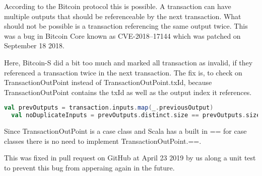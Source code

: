 According to the Bitcoin protocol this is possible.
A transaction can have multiple outputs that should be referenceable by the next transaction.
What should not be possible is a transaction referencing the same output twice.
This was a bug in Bitcoin Core known as CVE-2018–17144 which was patched on September 18 2018.

Here, Bitcoin-S did a bit too much and marked all transaction as invalid, if they referenced a transaction twice in the next transaction.
The fix is, to check on TransactionOutPoint instead of TransactionOutPoint.txId, because TransactionOutPoint contains the txId as well as the output index it references.
\begin{lstlisting}[language=scala]
  val prevOutputs = transaction.inputs.map(_.previousOutput)
  val noDuplicateInputs = prevOutputs.distinct.size == prevOutputs.size
\end{lstlisting}
Since TransactionOutPoint is a case class and Scala has a built in == for case classes there is no need to implement TransactionOutPoint.==.

This was fixed in pull request  on GitHub at April 23 2019 by us along a unit test to prevent this bug from apperaing again in the future.
